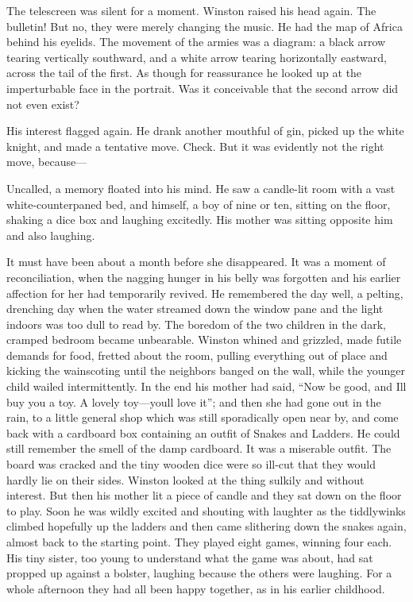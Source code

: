 The telescreen was silent for a moment. Winston raised his head again.
The bulletin! But no, they were merely changing the music. He had the
map of Africa behind his eyelids. The movement of the armies was a
diagram: a black arrow tearing vertically southward, and a white arrow
tearing horizontally eastward, across the tail of the first. As though
for reassurance he looked up at the imperturbable face in the portrait.
Was it conceivable that the second arrow did not even exist?

His interest flagged again. He drank another mouthful of gin, picked up
the white knight, and made a tentative move. Check. But it was evidently
not the right move, because---

Uncalled, a memory floated into his mind. He saw a candle-lit room with
a vast white-counterpaned bed, and himself, a boy of nine or ten,
sitting on the floor, shaking a dice box and laughing excitedly. His
mother was sitting opposite him and also laughing.

It must have been about a month before she disappeared. It was a moment
of reconciliation, when the nagging hunger in his belly was forgotten
and his earlier affection for her had temporarily revived. He remembered
the day well, a pelting, drenching day when the water streamed down the
window pane and the light indoors was too dull to read by. The boredom
of the two children in the dark, cramped bedroom became unbearable.
Winston whined and grizzled, made futile demands for food, fretted about
the room, pulling everything out of place and kicking the wainscoting
until the neighbors banged on the wall, while the younger child wailed
intermittently. In the end his mother had said, ``Now be good, and
I\textquotesingle ll buy you a toy. A lovely
toy---you\textquotesingle ll love it''; and then she had gone out in the
rain, to a little general shop which was still sporadically open near
by, and come back with a cardboard box containing an outfit of Snakes
and Ladders. He could still remember the smell of the damp cardboard. It
was a miserable outfit. The board was cracked and the tiny wooden dice
were so ill-cut that they would hardly lie on their sides. Winston
looked at the thing sulkily and without interest. But then his mother
lit a piece of candle and they sat down on the floor to play. Soon he
was wildly excited and shouting with laughter as the tiddlywinks climbed
hopefully up the ladders and then came slithering down the snakes again,
almost back to the starting point. They played eight games, winning four
each. His tiny sister, too young to understand what the game was about,
had sat propped up against a bolster, laughing because the others were
laughing. For a whole afternoon they had all been happy together, as in
his earlier childhood.

